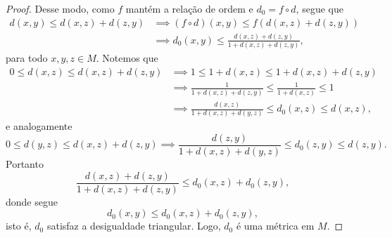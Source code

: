\begin{proof}
    Desse modo, como \(f\) mantém a relação de ordem e \(d_0 = f \circ d\), segue que
    \begin{align*}
        d(x,y) \leq d(x,z) + d(z, y) &\implies (f\circ d)(x,y) \leq f(d(x,z) + d(z,y))\\
                                     &\implies d_0(x,y) \leq \frac{d(x,z) + d(z,y)}{1 + d(x,z) + d(z,y)},
    \end{align*}
    para todo \(x,y,z \in M\). Notemos que
    \begin{align*}
        0 \leq d(x,z) \leq d(x,z) + d(z,y) &\implies 1 \leq 1 + d(x,z) \leq 1 + d(x,z) + d(z,y)\\
                                           &\implies \frac{1}{1+d(x,z) + d(z,y)} \leq \frac{1}{1+d(x,z)} \leq 1\\
                                           &\implies \frac{d(x,z)}{1+d(x,z)+d(y,z)} \leq d_0(x,z) \leq d(x,z),
    \end{align*}
    e analogamente
    \begin{equation*}
        0 \leq d(y,z) \leq d(x,z) + d(z,y) \implies \frac{d(z,y)}{1+d(x,z)+d(y,z)} \leq d_0(z,y) \leq d(z,y).
    \end{equation*}
    Portanto
    \begin{equation*}
        \frac{d(x,z) + d(z,y)}{1 + d(x,z) + d(z,y)} \leq d_0(x,z) + d_0(z,y),
    \end{equation*}
    donde segue
    \begin{equation*}
        d_0(x,y) \leq d_0(x,z) + d_0(z,y),
    \end{equation*}
    isto é, \(d_0\) satisfaz a desigualdade triangular. Logo, \(d_0\) é uma métrica em \(M\).
\end{proof}
